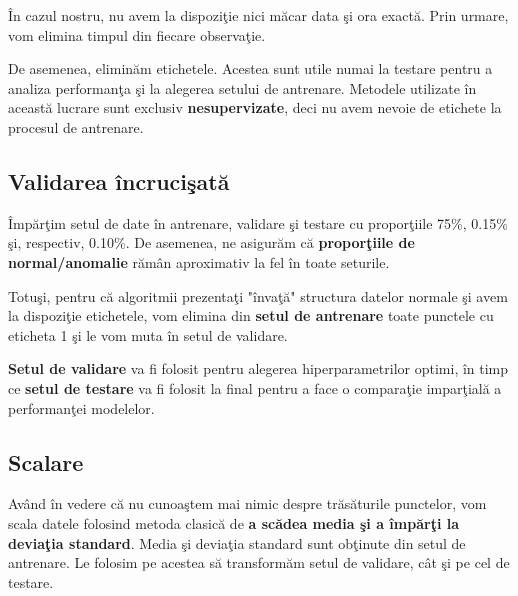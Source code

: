 În cazul nostru, nu avem la dispoziţie nici măcar data şi ora exactă. Prin urmare, vom
elimina timpul din fiecare observaţie.

De asemenea, eliminăm etichetele. Acestea sunt utile numai la testare pentru a analiza 
performanţa şi la alegerea setului de antrenare. Metodele utilizate în această lucrare
sunt exclusiv \textbf{nesupervizate}, deci nu avem nevoie de etichete la procesul de antrenare.

\subsection{Validarea încrucişată}

Împărţim setul de date în antrenare, validare şi testare cu proporţiile 75\%, 0.15\%
şi, respectiv, 0.10\%. De asemenea, ne asigurăm că 
\textbf{proporţiile de normal/anomalie} 
rămân aproximativ la fel în toate seturile.

Totuşi, pentru că algoritmii prezentaţi "învaţă" structura datelor normale şi avem 
la dispoziţie etichetele, vom elimina din \textbf{setul de antrenare}
toate punctele cu eticheta 
1 şi le vom muta în setul de validare.

\textbf{Setul de validare} va fi folosit pentru alegerea hiperparametrilor optimi, în timp ce 
\textbf{setul de testare} va fi folosit la final pentru a face o comparaţie imparţială 
a performanţei modelelor.

\subsection{Scalare}

Având în vedere că nu cunoaştem mai nimic despre trăsăturile punctelor, vom scala 
datele folosind metoda clasică de 
\textbf{a scădea media şi a împărţi la deviaţia standard}.
Media şi deviaţia standard sunt obţinute din setul de antrenare. Le folosim pe acestea 
să transformăm setul de validare, cât şi pe cel de testare.